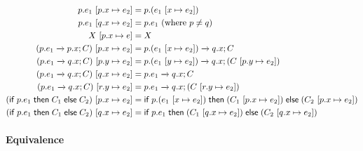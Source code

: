 \documentclass{article}
\theoremstyle{definition}
\newcommand{\subst}[3]{#1~[#2 \mapsto #3]}
\newcommand{\ceq}{\approx}
\newcommand{\own}[2]{#1.#2}
\newcommand{\send}[3][]{#2\nolinebreak \mathrel{\xrightarrow{#1}}\nolinebreak #3}
\newcommand{\cif}[3]{\textsf{if}~#1 \mathrel{\textsf{then}}\nolinebreak #2 \mathrel{\textsf{else}}\nolinebreak #3}
\newcommand{\clet}[2]{\textsf{let}~#1\nolinebreak =\nolinebreak #2 \mathrel{\textsf{in}}}
\begin{document}
\begin{align*}
  \subst{p.e_1}{\own{p}{x}}{e_2} &= p.(\subst{e_1}{x}{e_2})\\
  \subst{p.e_1}{\own{q}{x}}{e_2} &= p.e_1~\textrm{(where $p \neq q$)}\\
  \subst{X}{\own{p}{x}}{e} &= X\\
  \subst{(\send{\own{p}{e_1}}{\own{p}{x}}; C)}{\own{p}{x}}{e_2} &= \send{\own{p}{(\subst{e_1}{x}{e_2})}}{\own{q}{x}}; C\\
  \subst{(\send{\own{p}{e_1}}{\own{q}{x}}; C)}{\own{p}{y}}{e_2} &= \send{\own{p}{(\subst{e_1}{y}{e_2})}}{\own{q}{x}}; (\subst{C}{\own{p}{y}}{e_2})\\
  \subst{(\send{\own{p}{e_1}}{\own{q}{x}}; C)}{\own{q}{x}}{e_2} &= \send{\own{p}{e_1}}{\own{q}{x}}; C\\
  \subst{(\send{\own{p}{e_1}}{\own{q}{x}}; C)}{\own{r}{y}}{e_2} &= \send{\own{p}{e_1}}{\own{q}{x}}; (\subst{C}{\own{r}{y}}{e_2})\\
  \subst{(\cif{\own{p}{e_1}}{C_1}{C_2})}{\own{p}{x}}{e_2} &= \cif{\own{p}{(\subst{e_1}{x}{e_2})}}{(\subst{C_1}{\own{p}{x}}{e_2})}{(\subst{C_2}{\own{p}{x}}{e_2})}\\
  \subst{(\cif{\own{p}{e_1}}{C_1}{C_2})}{\own{q}{x}}{e_2} &= \cif{\own{p}{e_1}}{(\subst{C_1}{\own{q}{x}}{e_2})}{(\subst{C_2}{\own{q}{x}}{e_2})}
\end{align*}

\paragraph{Equivalence}
\noindent{}
\end{document}
